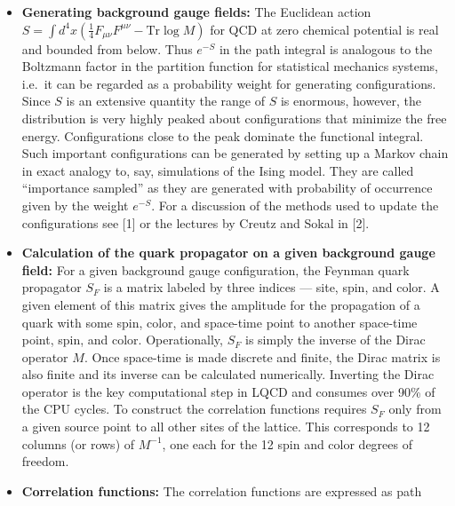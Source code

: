 \begin{itemize}
    results, and for dynamical simulations may even prove necessary due to
    limitations of computer power. At the same time it is important to note
    that there exists a well defined procedure for obtaining continuum results
    with even the simplest formulation, Wilson's original gauge and fermion
    action [19]. In this case, however, it is necessary to quantify and remove
    the discretization errors by a reliable extrapolation to $a = 0$.
  \item \textbf{Generating background gauge fields:} The Euclidean action $S = \int d^4x ( \frac{1}{4} F_{\mu\nu}F^{\mu\nu} - \mathrm{Tr}\log M )$ for QCD at zero chemical potential is real
    and bounded from below. Thus $e^{-S}$ in the path integral is analogous to
    the Boltzmann factor in the partition function for statistical mechanics
    systems, i.e.\ it can be regarded as a probability weight for generating configurations. Since $S$ is an extensive quantity the range of $S$ is enormous,
    however, the distribution is very highly peaked about configurations that
    minimize the free energy. Configurations close to the peak dominate the
    functional integral. Such important configurations can be generated by
    setting up a Markov chain in exact analogy to, say, simulations of the Ising
    model. They are called ``importance sampled'' as they are generated with
    probability of occurrence given by the weight $e^{-S}$. For a discussion of the
    methods used to update the configurations see [1] or the lectures by Creutz
    and Sokal in [2].
  \item \textbf{Calculation of the quark propagator on a given background gauge field:} For
    a given background gauge configuration, the Feynman quark propagator $S_F$
    is a matrix labeled by three indices --- site, spin, and color. A given element
    of this matrix gives the amplitude for the propagation of a quark with
    some spin, color, and space-time point to another space-time point, spin,
    and color. Operationally, $S_F$ is simply the inverse of the Dirac operator
    $M$. Once space-time is made discrete and finite, the Dirac matrix is also
    finite and its inverse can be calculated numerically. Inverting the Dirac
    operator is the key computational step in LQCD and consumes over 90\%
    of the CPU cycles. To construct the correlation functions requires $S_F$ only
    from a given source point to all other sites of the lattice. This corresponds
    to 12 columns (or rows) of $M^{-1}$, one each for the 12 spin and color degrees
    of freedom.
  \item \textbf{Correlation functions:} The correlation functions are expressed as path

\end{itemize}
